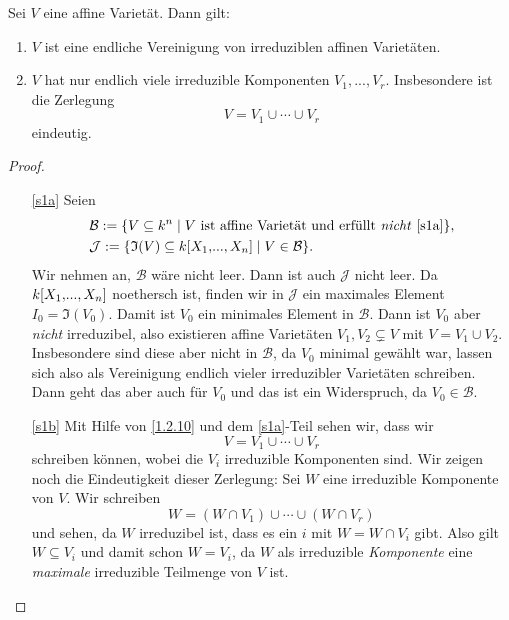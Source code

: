 \documentclass[a4paper,12pt,index=toc]{scrbook}
\theoremstyle{keinenummern} %
\def\I{\mathfrak{I}}
\def\B{\mathcal{B}}
\newcommand{\J}{\mathcal{J}}
\renewcommand{\dotsc}{\ensuremath{\!...}}
\newcommand{\polyx}[1][n]{\ensuremath%
  [X_{1},\dotsc,X_{#1}]}
\begin{document}
\pagebreak[3]
\begin{satz}\label{satz1} Sei $V$ eine affine Varietät. Dann gilt:
\begin{enumerate}
\item{} $V$ ist eine endliche Vereinigung von irreduziblen affinen Varietäten.
\item{} $V$ hat nur endlich viele irreduzible Komponenten $V_{1},\dotsc,V_{r}$. Insbesondere ist die Zerlegung
\begin{equation*}V=V_{1}\cup\dotsm\cup V_{r}\end{equation*}
eindeutig.\end{enumerate}\end{satz}
\begin{proof}\begin{enumerate}
\item[\ref{s1a}] Seien 
\begin{align*}&\B:=\{V\subseteq k^{n}\mid V\text{ ist affine Varietät und erfüllt \textit{nicht} \ref{s1a}}\},\\
&\J:=\{\I(V)\subseteq k\polyx\mid V\in\B\}.\end{align*}
Wir nehmen an, $\B$ wäre nicht leer. Dann ist auch $\J$ nicht leer. Da $k\polyx$ noethersch ist, finden wir in $\J$ ein maximales Element $I_{0}=\I(V_{0})$. Damit ist $V_{0}$ ein minimales Element in $\B$. Dann ist $V_{0}$ aber \textit{nicht} irreduzibel, also existieren affine Varietäten $V_{1},V_{2}\subsetneq V$ mit $V=V_{1}\cup V_{2}$. Insbesondere sind diese aber nicht in $\B$, da $V_{0}$ minimal gewählt war, lassen sich also als Vereinigung endlich vieler irreduzibler Varietäten schreiben. Dann geht das aber auch für $V_{0}$ und das ist ein Widerspruch, da $V_{0}\in\B$.
\item[\ref{s1b}] Mit Hilfe von \cref{1.2.10} und dem \ref{s1a}-Teil sehen wir, dass wir \begin{equation*}V=V_{1}\cup\dotsm\cup V_{r}\end{equation*} schreiben können, wobei die $V_{i}$ irreduzible Komponenten sind. Wir zeigen noch die Eindeutigkeit dieser Zerlegung: Sei $W$ eine irreduzible Komponente von $V$. Wir schreiben
\begin{equation*}W=(W\cap V_{1})\cup\dotsm\cup(W\cap V_{r})\end{equation*}
und sehen, da $W$ irreduzibel ist, dass es ein $i$ mit $W=W\cap V_{i}$ gibt. Also gilt $W\subseteq V_{i}$ und damit schon $W=V_{i}$, da $W$ als irreduzible \textit{Komponente} eine \textit{maximale} irreduzible Teilmenge von $V$ ist.
\end{enumerate}\end{proof}
\end{document}
